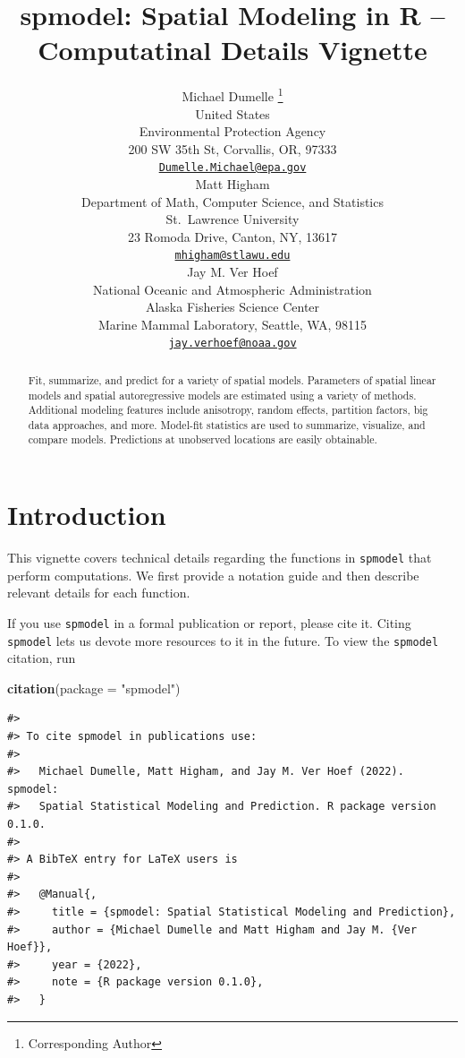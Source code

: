 \documentclass{article}
\title{spmodel: Spatial Modeling in \textbf{R} -- Computatinal Details Vignette}
\author{
    Michael Dumelle
    \thanks{Corresponding Author}
   \\
    United States \\
    Environmental Protection Agency \\
  200 SW 35th St, Corvallis, OR, 97333 \\
  \texttt{\href{mailto:Dumelle.Michael@epa.gov}{\nolinkurl{Dumelle.Michael@epa.gov}}} \\
   \And
    Matt Higham
   \\
    Department of Math, Computer Science, and Statistics \\
    St.~Lawrence University \\
  23 Romoda Drive, Canton, NY, 13617 \\
  \texttt{\href{mailto:mhigham@stlawu.edu}{\nolinkurl{mhigham@stlawu.edu}}} \\
   \And
    Jay M. Ver Hoef
   \\
    National Oceanic and Atmospheric Administration \\
    Alaska Fisheries Science Center \\
  Marine Mammal Laboratory, Seattle, WA, 98115 \\
  \texttt{\href{mailto:jay.verhoef@noaa.gov}{\nolinkurl{jay.verhoef@noaa.gov}}} \\
  }
\newenvironment{Shaded}{\begin{snugshade}}{\end{snugshade}}
\newcommand{\DataTypeTok}[1]{\textcolor[rgb]{0.13,0.29,0.53}{#1}}
\newcommand{\KeywordTok}[1]{\textcolor[rgb]{0.13,0.29,0.53}{\textbf{#1}}}
\newcommand{\NormalTok}[1]{#1}
\newcommand{\StringTok}[1]{\textcolor[rgb]{0.31,0.60,0.02}{#1}}
\begin{document}
\maketitle


\begin{abstract}
Fit, summarize, and predict for a variety of spatial models. Parameters
of spatial linear models and spatial autoregressive models are estimated
using a variety of methods. Additional modeling features include
anisotropy, random effects, partition factors, big data approaches, and
more. Model-fit statistics are used to summarize, visualize, and compare
models. Predictions at unobserved locations are easily obtainable.
\end{abstract}


\hypertarget{introduction}{%
\section{Introduction}\label{introduction}}

This vignette covers technical details regarding the functions in
\texttt{spmodel} that perform computations. We first provide a notation
guide and then describe relevant details for each function.

If you use \texttt{spmodel} in a formal publication or report, please
cite it. Citing \texttt{spmodel} lets us devote more resources to it in
the future. To view the \texttt{spmodel} citation, run

\begin{Shaded}
\begin{Highlighting}[]
\KeywordTok{citation}\NormalTok{(}\DataTypeTok{package =} \StringTok{"spmodel"}\NormalTok{)}
\end{Highlighting}
\end{Shaded}

\begin{verbatim}
#> 
#> To cite spmodel in publications use:
#> 
#>   Michael Dumelle, Matt Higham, and Jay M. Ver Hoef (2022). spmodel:
#>   Spatial Statistical Modeling and Prediction. R package version 0.1.0.
#> 
#> A BibTeX entry for LaTeX users is
#> 
#>   @Manual{,
#>     title = {spmodel: Spatial Statistical Modeling and Prediction},
#>     author = {Michael Dumelle and Matt Higham and Jay M. {Ver Hoef}},
#>     year = {2022},
#>     note = {R package version 0.1.0},
#>   }
\end{verbatim}
\end{document}
